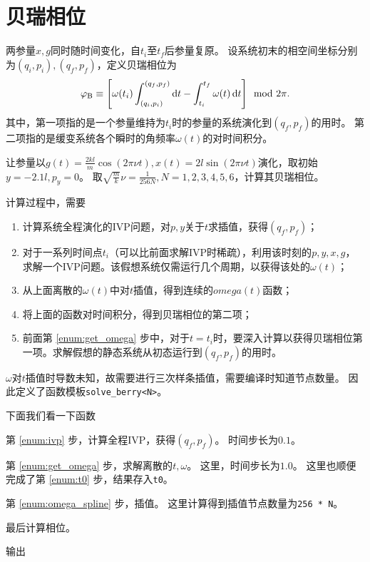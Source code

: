\documentclass[a4paper,unicode]{report}
\begin{document}
\section{贝瑞相位}

两参量$x, g$同时随时间变化，自$t_i$至$t_f$后参量复原。
设系统初末的相空间坐标分别为$(q_i, p_i), (q_f, p_f)$，定义贝瑞相位为
\begin{equation}
    \varphi_\mathrm{B} \equiv \qty[
        \omega(t_i) \int_{(q_i, p_i)}^{(q_f, p_f)} \dd{t}
        - \int_{t_i}^{t_f}\omega(t)\dd{t}
    ] \mod{2\pi}.
\end{equation}
其中，第一项指的是一个参量维持为$t_i$时的参量的系统演化到$(q_f, p_f)$的用时。
第二项指的是缓变系统各个瞬时的角频率$\omega(t)$的对时间积分。

让参量以$g(t)=\frac{2kl}{m}\cos(2\pi\nu t),x(t) = 2l\sin(2\pi\nu t)$演化，取初始$y=-2.1l,p_y=0$。
取$\sqrt{\frac{m}{k}}\nu=\frac{1}{256N}, N=1,2,3,4,5,6$，计算其贝瑞相位。

计算过程中，需要
\begin{enumerate}
    \item \label{enum:ivp}计算系统全程演化的IVP问题，对$p, y$关于$t$求插值，获得$(q_f, p_f)$；
    \item \label{enum:get_omega}对于一系列时间点$t_i$（可以比前面求解IVP时稀疏），利用该时刻的$p, y, x, g$，求解一个IVP问题。该假想系统仅需运行几个周期，以获得该处的$\omega(t)$；
    \item \label{enum:omega_spline}从上面离散的$\omega(t)$中对$t$插值，得到连续的$omega(t)$函数；
    \item 将上面的函数对时间积分，得到贝瑞相位的第二项；
    \item \label{enum:t0} 前面第 \ref{enum:get_omega} 步中，对于$t=t_i$时，要深入计算以获得贝瑞相位第一项。求解假想的静态系统从初态运行到$(q_f,p_f)$的用时。
\end{enumerate}

$\omega$对$t$插值时导数未知，故需要进行三次样条插值，需要编译时知道节点数量。
因此定义了函数模板\verb|solve_berry<N>|。

下面我们看一下函数
{
    \linespread{1.0}
    
}
第 \ref{enum:ivp} 步，计算全程IVP，获得$(q_f, p_f)$。
时间步长为$0.1$。
{
    \linespread{1.0}
    
}
第 \ref{enum:get_omega} 步，求解离散的$t, \omega$。
这里，时间步长为$1.0$。
这里也顺便完成了第 \ref{enum:t0} 步，结果存入\verb|t0|。
{
    \linespread{1.0}
    
}
第 \ref{enum:omega_spline} 步，插值。
这里计算得到插值节点数量为\verb|256 * N|。
{
    \linespread{1.0}
    
}
最后计算相位。
{
    \linespread{1.0}
    
}
输出
{
    \linespread{1.0}
    
}
\end{document}
